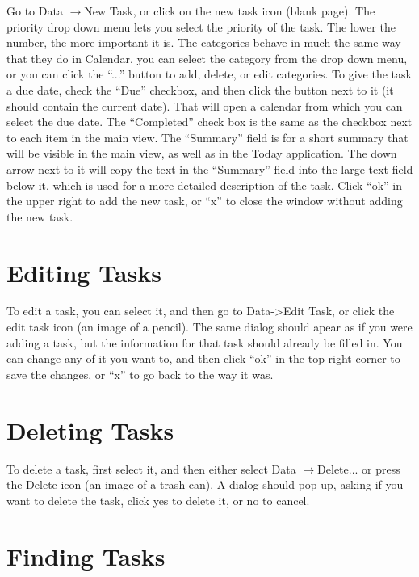 \documentclass[12pt,letterpaper,oneside, openany]{book} \usepackage[latin1] {inputenc}
\begin{document}
Go to Data \begin{math}\rightarrow\end{math}New Task, or click on the new task icon (blank page). The priority drop down menu lets you select the priority of the task. The lower the number, the more important it is. The categories behave in much the same way that they do in Calendar, you can select the category from the drop down menu, or you can click the ``...'' button to add, delete, or edit categories. To give the task a due date, check the ``Due'' checkbox, and then click the button next to it (it should contain the current date). That will open a calendar from which you can select the due date. The ``Completed'' check box is the same as the checkbox next to each item in the main view. The ``Summary'' field is for a short summary that will be visible in the main view, as well as in the Today application.  The down arrow next to it will copy the text in the ``Summary'' field into the large text field below it, which is used for a more detailed description of the task.  Click ``ok'' in the upper right to add the new task, or ``x'' to close the window without adding the new task. 

\section{Editing Tasks}

To edit a task, you can select it, and then go to Data->Edit Task, or click the edit task icon (an image of a pencil). The same dialog should apear as if you were adding a task, but the information for that task should already be filled in. You can change any of it you want to, and then click ``ok'' in the top right corner to save the changes, or ``x'' to go back to the way it was. 

\section{Deleting Tasks}

To delete a task, first select it, and then either select Data \begin{math}\rightarrow\end{math}Delete... or press the Delete icon (an image of a trash can). A dialog should pop up, asking if you want to delete the task, click yes to delete it, or no to cancel. 

\section{Finding Tasks}
\end{document}
